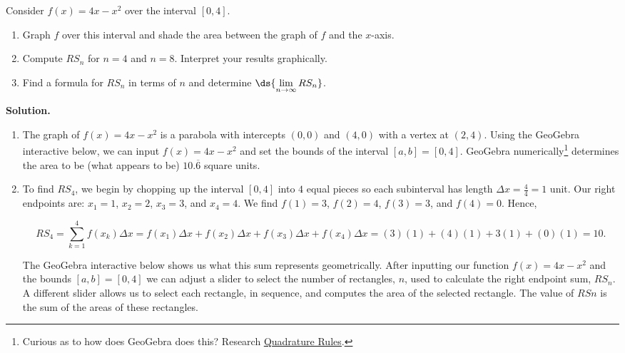 \documentclass{ximera}
\begin{document}
\begin{example} \label{rightsumex}  Consider $f(x) = 4x-x^2$ over the interval $[0,4]$.

\begin{enumerate}

\item  Graph $f$ over this interval and shade the area between the graph of $f$ and the $x$-axis.

\item  Compute $RS_{n}$ for $n=4$ and $n=8$.  Interpret your results graphically.

\item  Find a formula for $RS_{n}$ in terms of $n$ and determine  $\ds{\lim_{n \rightarrow \infty} RS_{n}}$.

\end{enumerate}

\newpage

{\bf Solution.}

\begin{enumerate}

\item The graph of $f(x) = 4x-x^2$ is a parabola with intercepts $(0,0)$ and $(4,0)$ with a vertex at $(2,4)$.  Using the GeoGebra interactive below, we can input $f(x) = 4x-x^2$ and set the bounds of the interval $[a,b] = [0,4]$.  GeoGebra numerically\footnote{Curious as to how does GeoGebra does this? Research \href{https://en.wikipedia.org/wiki/Gaussian_quadrature}{\underline{Quadrature Rules}}. } determines the area to be (what appears to be) $10.\overline{6}$ square units.

\begin{center}
\end{center}

\item  To find $RS_{4}$, we begin by chopping up the interval $[0,4]$ into $4$ equal pieces so each subinterval has length $\Delta x  =  \frac{4}{4} = 1$ unit.  Our right endpoints are: $x_{1} = 1$, $x_{2} = 2$, $x_{3} = 3$, and $x_{4} = 4$.  We find $f(1) = 3$, $f(2) = 4$, $f(3) = 3$, and $f(4) = 0$.   Hence,

\[ RS_{4} = \sum_{k=1}^{4} f(x_{k}) \Delta x = f(x_{1}) \Delta x + f(x_{2}) \Delta x + f(x_{3}) \Delta x + f(x_{4}) \Delta x = (3)(1) + (4)(1) + 3(1) + (0)(1) = 10.\]

The GeoGebra interactive below shows us what this sum represents geometrically.  After inputting our function $f(x) = 4x- x^2$ and the bounds $[a,b]=[0,4]$ we can adjust a slider to select the number of rectangles, $n$, used to calculate the right endpoint sum, $RS_{n}$.  A different slider allows us to select each rectangle, in sequence, and computes the area of the selected rectangle. The value of $RS{n}$ is the sum of the areas of these rectangles.   


\end{enumerate}
\end{example}
\end{document}

